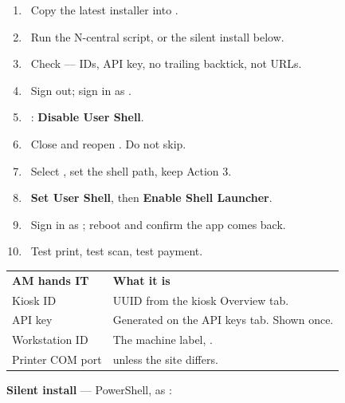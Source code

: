 \documentclass[a4paper,10pt]{article}
\begin{document}
\begin{center}
\begin{minipage}[t]{0.475\textwidth}
\begin{enumerate}[leftmargin=6mm,itemsep=3pt]
  \item \emptybox\ Copy the latest installer into
        .
  \item \emptybox\ Run the N-central script, or the silent install below.
  \item \emptybox\ Check  --- IDs, API key, no
        trailing backtick,  not  URLs.
  \item \emptybox\ Sign out; sign in as .
  \item \emptybox\ : \textbf{Disable User Shell}.
  \item \emptybox\ Close and reopen . Do not skip.
  \item \emptybox\ Select , set the shell path,
        keep Action 3.
  \item \emptybox\ \textbf{Set User Shell}, then \textbf{Enable Shell
        Launcher}.
  \item \emptybox\ Sign in as ; reboot and confirm the
        app comes back.
  \item \emptybox\ Test print, test scan, test payment.
\end{enumerate}
\end{minipage}
\end{center}

\vspace{6pt}

\begin{center}
\renewcommand{\arraystretch}{1.2}\footnotesize
\begin{tabularx}{\textwidth}{L{34mm} X}
\color{white}\textbf{AM hands IT} &
\color{white}\textbf{What it is}\\
Kiosk ID & UUID from the kiosk Overview tab.\\
API key & Generated on the API keys tab. Shown once.\\
Workstation ID & The machine label, .\\
Printer COM port &  unless the site differs.\\
\end{tabularx}
\end{center}

\vspace{4pt}
\noindent\textbf{\footnotesize Silent install} --- PowerShell, as
:
\end{document}
